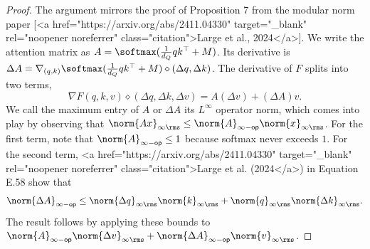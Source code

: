 \begin{proof}
    The argument mirrors the proof of Proposition 7 from the modular norm paper [<a href="https://arxiv.org/abs/2411.04330" target="_blank" rel="noopener noreferrer" class="citation">Large et al., 2024</a>]. We write the attention matrix as $A = \softmax(\tfrac{1}{d_Q} qk^\top + M)$. Its derivative is $\Delta A = \nabla_{(q,k)} \softmax(\tfrac{1}{d_Q} qk^\top + M) \diamond (\Delta q, \Delta k)$. The derivative of $F$ splits into two terms, \begin{equation}
        \label{eq:attention-lipschitz}
        \nabla F(q, k, v) \diamond (\Delta q, \Delta k, \Delta v) = A (\Delta v) + (\Delta A) v.
    \end{equation} We call the maximum entry of $A$ or $\Delta A$ its $L^\infty$ operator norm, which comes into play by observing that $\norm{Ax}_{\infty\rms} \leq \norm{A}_{\infty-\mathsf{op}} \norm{x}_{\infty\rms}$. For the first term, note that $\norm{A}_{\infty-\mathsf{op}} \leq 1$ because softmax never exceeds $1$. For the second term, <a href="https://arxiv.org/abs/2411.04330" target="_blank" rel="noopener noreferrer" class="citation">Large et al. (2024</a>) in Equation E.58 show that \begin{equation}
        \norm{\Delta A}_{\infty-\mathsf{op}} \leq \norm{\Delta q}_{\infty\rms} \norm{k}_{\infty\rms} + \norm{q}_{\infty\rms} \norm{\Delta k}_{\infty\rms}.
    \end{equation} The result follows by applying these bounds to $\norm{A}_{\infty-\mathsf{op}} \norm{\Delta v}_{\infty\rms} + \norm{\Delta A}_{\infty-\mathsf{op}} \norm{v}_{\infty\rms}$.
\end{proof}

